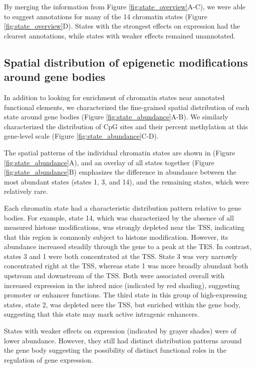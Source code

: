 \documentclass[10pt,letterpaper]{article}
\begin{document}
By merging the information from Figure \ref{fig:state_overview}A-C), we
were able to suggest annotations for many of the 14 chromatin states
(Figure \ref{fig:state_overview}D). States with the strongest effects on
expression had the clearest annotations, while states with weaker
effects remained unannotated.

\hypertarget{spatial-distribution-of-epigenetic-modifications-around-gene-bodies}{%
\subsection{Spatial distribution of epigenetic modifications around gene
bodies}\label{spatial-distribution-of-epigenetic-modifications-around-gene-bodies}}

In addition to looking for enrichment of chromatin states near annotated
functional elements, we characterized the fine-grained spatial
distribution of each state around gene bodies (Figure
\ref{fig:state_abundance}A-B). We similarly characterized the
distribution of CpG sites and their percent methylation at this
gene-level scale (Figure \ref{fig:state_abundance}C-D).

The spatial patterns of the individual chromatin states are shown in
(Figure \ref{fig:state_abundance}A), and an overlay of all states
together (Figure \ref{fig:state_abundance}B) emphasizes the difference
in abundance between the most abundant states (states 1, 3, and 14), and
the remaining states, which were relatively rare.

Each chromatin state had a characteristic distribution pattern relative
to gene bodies. For example, state 14, which was characterized by the
absence of all measured histone modifications, was strongly depleted
near the TSS, indicating that this region is commonly subject to histone
modification. However, its abundance increased steadily through the gene
to a peak at the TES. In contrast, states 3 and 1 were both concentrated
at the TSS. State 3 was very narrowly concentrated right at the TSS,
whereas state 1 was more broadly abundant both upstream and downstream
of the TSS. Both were associated overall with increased expression in
the inbred mice (indicated by red shading), suggesting promoter or
enhancer functions. The third state in this group of high-expressing
states, state 2, was depleted nere the TSS, but enriched within the gene
body, suggesting that this state may mark active intragenic enhancers.

States with weaker effects on expression (indicated by grayer shades)
were of lower abundance. However, they still had distinct distribution
patterns around the gene body suggesting the possibility of distinct
functional roles in the regulation of gene expression.
\end{document}

